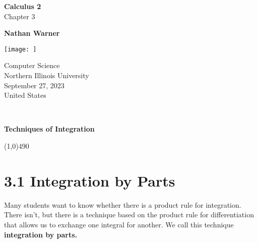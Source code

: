 \documentclass{report}
\title{\Huge{}}
\author{\huge{Nathan Warner}}
\date{\huge{}}
\begin{document}
        \begin{titlepage}
       \begin{center}
           \vspace*{1cm}
    
           \textbf{Calculus 2} \\
           Chapter 3
    
           \vspace{0.5cm}
            
                
           \vspace{1.5cm}
    
           \textbf{Nathan Warner}
    
           \vfill
                
                
           \vspace{0.8cm}
         
           \texttt{[image: ]}
                
           Computer Science \\
           Northern Illinois University\\
           September 27, 2023 \\
           United States\\
           
                
       \end{center}
    \end{titlepage}
    \tableofcontents
    \pagebreak \bigbreak \noindent
    \vspace{2in} \\
    \begin{Huge}
       \textbf{Techniques of Integration} 
    \end{Huge}
    \bigbreak \noindent 
    \line(1,0){490}
    \bigbreak \noindent 
    
    \section*{\Large 3.1 Integration by Parts}
    \bigbreak \noindent 
    \smallbreak \noindent
    \begin{definition}
        Many students want to know whether there is a product rule for integration. There isn’t, but there is a technique based on the product rule for differentiation that allows us to exchange one integral for another. We call this technique \textbf{integration by parts.}
    \end{definition}
\end{document}
